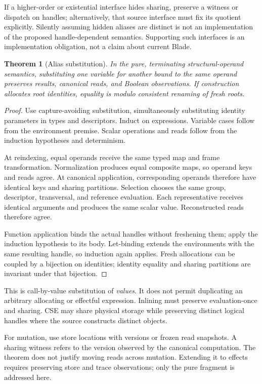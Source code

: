 \documentclass[11pt]{article}
\newtheorem{theorem}{Theorem}
\begin{document}
If a higher-order or existential interface hides sharing, preserve a witness or dispatch on handles; alternatively, that source interface must fix its quotient explicitly. Silently assuming hidden aliases are distinct is not an implementation of the proposed handle-dependent semantics. Supporting such interfaces is an implementation obligation, not a claim about current Blade.

\begin{theorem}[Alias substitution]
In the pure, terminating structural-operand semantics, substituting one variable for another bound to the same operand preserves results, canonical reads, and Boolean observations. If construction allocates root identities, equality is modulo consistent renaming of fresh roots.
\end{theorem}
\begin{proof}
Use capture-avoiding substitution, simultaneously substituting identity parameters in types and descriptors. Induct on expressions. Variable cases follow from the environment premise. Scalar operations and reads follow from the induction hypotheses and determinism.

At reindexing, equal operands receive the same typed map and frame transformation. Normalization produces equal composite maps, so operand keys and reads agree. At canonical application, corresponding operands therefore have identical keys and sharing partitions. Selection chooses the same group, descriptor, transversal, and reference evaluation. Each representative receives identical arguments and produces the same scalar value. Reconstructed reads therefore agree.

Function application binds the actual handles without freshening them; apply the induction hypothesis to its body. Let-binding extends the environments with the same resulting handle, so induction again applies. Fresh allocations can be coupled by a bijection on identities; identity equality and sharing partitions are invariant under that bijection.
\end{proof}
This is call-by-value substitution of \emph{values}. It does not permit duplicating an arbitrary allocating or effectful expression. Inlining must preserve evaluation-once and sharing. CSE may share physical storage while preserving distinct logical handles where the source constructs distinct objects.

For mutation, use store locations with versions or frozen read snapshots. A sharing witness refers to the version observed by the canonical computation. The theorem does not justify moving reads across mutation. Extending it to effects requires preserving store and trace observations; only the pure fragment is addressed here.
\end{document}
